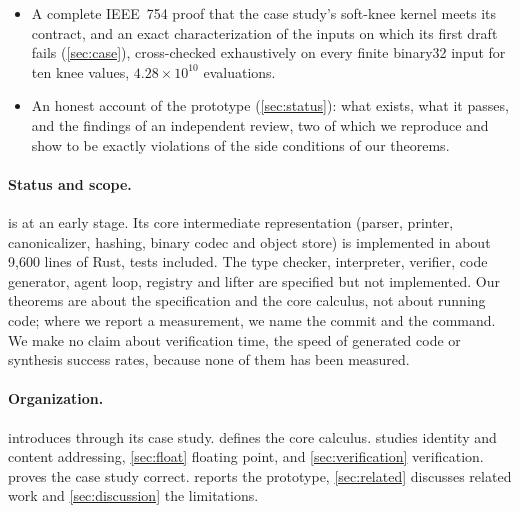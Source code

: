 \begin{itemize}
  rules, the fresh-element rule and an exact bit-width encoding of mathematical integers
  (\cref{thm:widths}) are sound (\cref{thm:soundness}), provided each obligation is checked
  only against facts of operations that precede it in a topological order. A four-operation
  program shows that this proviso is necessary (\cref{prop:ordering-needed}); the current
  specification does not state it. The counterexample-replay classification is sound too
  (\cref{thm:replay}).
\item A complete IEEE~754 proof that the case study's soft-knee kernel meets its contract,
  and an exact characterization of the inputs on which its first draft fails
  (\cref{sec:case}), cross-checked exhaustively on every finite binary32 input for ten knee
  values, $4.28\times10^{10}$ evaluations.
\item An honest account of the prototype (\cref{sec:status}): what exists, what it passes, and
  the findings of an independent review, two of which we reproduce and show to be exactly
  violations of the side conditions of our theorems.
\end{itemize}

\paragraph{Status and scope.}
\VG{} is at an early stage. Its core intermediate representation (parser, printer,
canonicalizer, hashing, binary codec and object store) is implemented in about 9,600 lines of
Rust, tests included. The type checker, interpreter, verifier, code generator, agent loop,
registry and lifter are specified but not implemented. Our theorems are about the
specification and the core calculus, not about running code; where we report a measurement,
we name the commit and the command. We make no claim about verification time, the speed of
generated code or synthesis success rates, because none of them has been measured.

\paragraph{Organization.}
 introduces \VG{} through its case study.  defines the
core calculus.  studies identity and content addressing,
\cref{sec:float} floating point, and \cref{sec:verification} verification.
 proves the case study correct.  reports the prototype,
\cref{sec:related} discusses related work and \cref{sec:discussion} the limitations.
